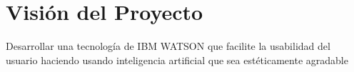 \chapter{Visión del Proyecto}
Desarrollar una tecnología de IBM WATSON que facilite la usabilidad del usuario haciendo usando inteligencia artificial que sea estéticamente agradable